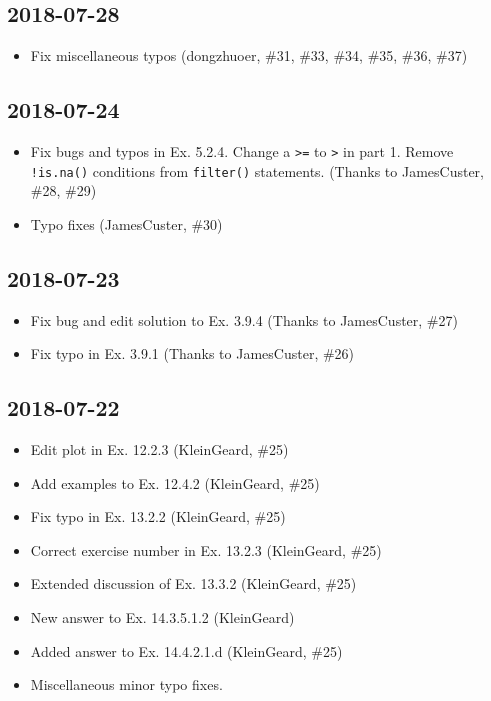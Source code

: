 \documentclass[]{book}
\providecommand{\tightlist}{%
  \setlength{\itemsep}{0pt}\setlength{\parskip}{0pt}}
\theoremstyle{plain}
\theoremstyle{remark}
\theoremstyle{definition}
\theoremstyle{definition}
\theoremstyle{definition}
\theoremstyle{remark}
\begin{document}
\hypertarget{section-8}{%
\subsection*{2018-07-28}\label{section-8}}

\begin{itemize}
\tightlist
\item
  Fix miscellaneous typos (dongzhuoer, \#31, \#33, \#34, \#35, \#36,
  \#37)
\end{itemize}

\hypertarget{section-9}{%
\subsection*{2018-07-24}\label{section-9}}

\begin{itemize}
\tightlist
\item
  Fix bugs and typos in Ex. 5.2.4. Change a \texttt{\textgreater{}=} to
  \texttt{\textgreater{}} in part 1. Remove \texttt{!is.na()} conditions
  from \texttt{filter()} statements. (Thanks to JamesCuster, \#28, \#29)
\item
  Typo fixes (JamesCuster, \#30)
\end{itemize}

\hypertarget{section-10}{%
\subsection*{2018-07-23}\label{section-10}}

\begin{itemize}
\tightlist
\item
  Fix bug and edit solution to Ex. 3.9.4 (Thanks to JamesCuster, \#27)
\item
  Fix typo in Ex. 3.9.1 (Thanks to JamesCuster, \#26)
\end{itemize}

\hypertarget{section-11}{%
\subsection*{2018-07-22}\label{section-11}}

\begin{itemize}
\tightlist
\item
  Edit plot in Ex. 12.2.3 (KleinGeard, \#25)
\item
  Add examples to Ex. 12.4.2 (KleinGeard, \#25)
\item
  Fix typo in Ex. 13.2.2 (KleinGeard, \#25)
\item
  Correct exercise number in Ex. 13.2.3 (KleinGeard, \#25)
\item
  Extended discussion of Ex. 13.3.2 (KleinGeard, \#25)
\item
  New answer to Ex. 14.3.5.1.2 (KleinGeard)
\item
  Added answer to Ex. 14.4.2.1.d (KleinGeard, \#25)
\item
  Miscellaneous minor typo fixes.
\end{itemize}
\end{document}
